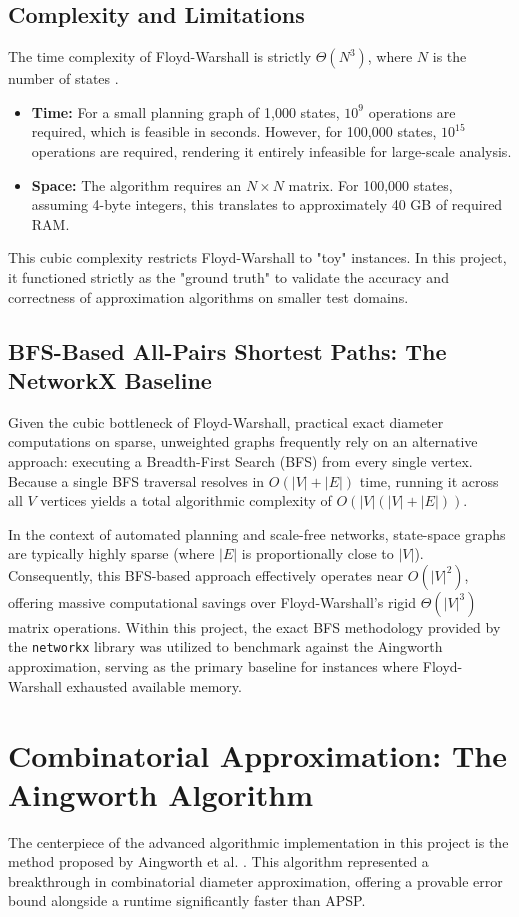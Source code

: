 \subsection{Complexity and Limitations}
The time complexity of Floyd-Warshall is strictly $\Theta(N^3)$, where $N$ is the number of states \cite{ecealgo}. 
\begin{itemize}
    \item \textbf{Time:} For a small planning graph of 1,000 states, $10^9$ operations are required, which is feasible in seconds. However, for 100,000 states, $10^{15}$ operations are required, rendering it entirely infeasible for large-scale analysis.
    \item \textbf{Space:} The algorithm requires an $N \times N$ matrix. For 100,000 states, assuming 4-byte integers, this translates to approximately 40 GB of required RAM.
\end{itemize}
This cubic complexity restricts Floyd-Warshall to "toy" instances. In this project, it functioned strictly as the "ground truth" to validate the accuracy and correctness of approximation algorithms on smaller test domains.

\subsection{BFS-Based All-Pairs Shortest Paths: The NetworkX Baseline}
Given the cubic bottleneck of Floyd-Warshall, practical exact diameter computations on sparse, unweighted graphs frequently rely on an alternative approach: executing a Breadth-First Search (BFS) from every single vertex. Because a single BFS traversal resolves in $O(|V| + |E|)$ time, running it across all $V$ vertices yields a total algorithmic complexity of $O(|V|(|V| + |E|))$. 

In the context of automated planning and scale-free networks, state-space graphs are typically highly sparse (where $|E|$ is proportionally close to $|V|$). Consequently, this BFS-based approach effectively operates near $O(|V|^2)$, offering massive computational savings over Floyd-Warshall's rigid $\Theta(|V|^3)$ matrix operations. Within this project, the exact BFS methodology provided by the \texttt{networkx} library was utilized to benchmark against the Aingworth approximation, serving as the primary baseline for instances where Floyd-Warshall exhausted available memory.

\section{Combinatorial Approximation: The Aingworth Algorithm}
The centerpiece of the advanced algorithmic implementation in this project is the method proposed by Aingworth et al. \cite{aingworth96}. This algorithm represented a breakthrough in combinatorial diameter approximation, offering a provable error bound alongside a runtime significantly faster than APSP.

